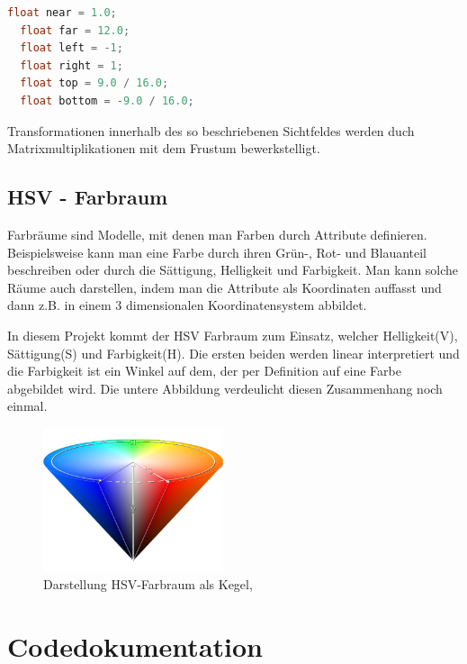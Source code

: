 \documentclass[11pt]{article}
\begin{document}
\begin{lstlisting}[language=C]
  float near = 1.0;
  float far = 12.0;
  float left = -1;
  float right = 1;
  float top = 9.0 / 16.0;
  float bottom = -9.0 / 16.0;

\end{lstlisting}
Transformationen innerhalb des so beschriebenen Sichtfeldes werden duch Matrixmultiplikationen mit dem Frustum bewerkstelligt.
\cite{delphigl}

\subsection{HSV - Farbraum}

Farbräume sind Modelle, mit denen man Farben durch Attribute definieren. 
Beispielsweise kann man eine Farbe durch ihren Grün-, Rot- und Blauanteil beschreiben oder 
durch die Sättigung, Helligkeit und Farbigkeit. Man kann solche Räume auch darstellen, indem man 
die Attribute als Koordinaten auffasst und dann z.B. in einem 3 dimensionalen Koordinatensystem abbildet. 
\cite{CS1}

In diesem Projekt kommt der HSV Farbraum zum Einsatz, welcher Helligkeit(V), Sättigung(S) und Farbigkeit(H).
Die ersten beiden werden linear interpretiert und die Farbigkeit ist ein Winkel auf dem, der per Definition auf eine Farbe abgebildet wird.
Die untere Abbildung verdeulicht diesen Zusammenhang noch einmal. 
\cite{CS2}
\begin{figure}[h]
  \centering
  \includegraphics[width=200px]{../images/hsv.png}
  \caption{Darstellung HSV-Farbraum als Kegel, \cite{picWiki}}
\end{figure}

\pagebreak

\section{Codedokumentation}

\end{document}
